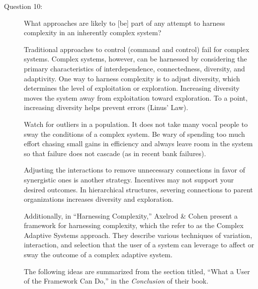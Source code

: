 \documentclass[letterpaper,10pt]{article}
\begin{document}
\begin{description}
\item[Question 10:]
What approaches are likely to [be] part of any attempt to harness complexity in an inherently complex system?

Traditional approaches to control (command and control) fail for complex systems.  Complex systems, however, can be harnessed by considering the primary characteristics of interdependence, connectedness, diversity, and adaptivity.  One way to harness complexity is to adjust diversity, which determines the level of exploitation or exploration.  Increasing diversity moves the system away from exploitation toward exploration.  To a point, increasing diversity helps prevent errors
(Linus' Law).

Watch for outliers in a population.  It does not take many vocal people to sway the conditions of a complex system.  Be wary of spending too much effort chasing small gains in efficiency and always leave room in the system so that failure does not cascade (as in recent bank failures).

Adjusting the interactions to remove unnecessary connections in favor of synergistic ones is another strategy.  Incentives may not support your desired outcomes.  In hierarchical structures, severing connections to parent organizations increases diversity and exploration.

Additionally, in ``Harnessing Complexity,'' Axelrod \& Cohen present a framework for harnessing complexity, which the refer to as the Complex Adaptive Systems approach.  They describe various techniques of variation, interaction, and selection that the user of a system can leverage to affect or sway the outcome of a complex adaptive system.

The following ideas are summarized from the section titled, ``What a User of the Framework Can Do,'' in the \emph{Conclusion} of their book.


\end{description}
\end{document}
